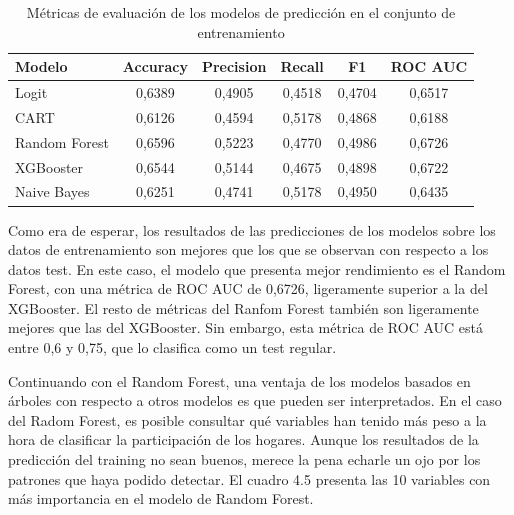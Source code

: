 \begin{table}[ht]
    \centering
    \begin{tabular}{lccccc}
    \hline
        \textbf{Modelo} & \textbf{Accuracy} & \textbf{Precision} & \textbf{Recall} & \textbf{F1} & \textbf{ROC AUC} \\ \hline
        Logit & 0,6389 & 0,4905 & 0,4518 & 0,4704 & 0,6517 \\ 
        CART & 0,6126 & 0,4594 & 0,5178 & 0,4868 & 0,6188 \\ 
        Random Forest & 0,6596 & 0,5223 & 0,4770 & 0,4986 & 0,6726 \\ 
        XGBooster & 0,6544 & 0,5144 & 0,4675 & 0,4898 & 0,6722 \\ 
        Naive Bayes & 0,6251 & 0,4741 & 0,5178 & 0,4950 & 0,6435 \\ \hline
    \end{tabular}
    \caption{Métricas de evaluación de los modelos de predicción en el conjunto de entrenamiento}
\end{table}

Como era de esperar, los resultados de las predicciones de los modelos sobre los datos de entrenamiento son mejores que los que se observan con respecto a los datos test. En este caso, el modelo que presenta mejor rendimiento es el Random Forest, con una métrica de ROC AUC de 0,6726, ligeramente superior a la del XGBooster. El resto de métricas del Ranfom Forest también son ligeramente mejores que las del XGBooster. Sin embargo, esta métrica de ROC AUC está entre 0,6 y 0,75, que lo clasifica como un test regular.

Continuando con el Random Forest, una ventaja de los modelos basados en árboles con respecto a otros modelos es que pueden ser interpretados. En el caso del Radom Forest, es posible consultar qué variables han tenido más peso a la hora de clasificar la participación de los hogares. Aunque los resultados de la predicción del training no sean buenos, merece la pena echarle un ojo por los patrones que haya podido detectar. El cuadro 4.5 presenta las 10 variables con más importancia en el modelo de Random Forest.

